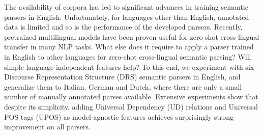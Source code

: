 The availability of corpora has led to significant advances in training  semantic parsers in English. Unfortunately, for languages other than English, annotated data is limited and so is the performance of the developed parsers. Recently, pretrained multilingual models have been proven useful for zero-shot cross-lingual transfer in many NLP tasks. What else does it require to apply a parser trained in English to other languages for zero-shot cross-lingual semantic parsing? Will simple language-independent features help? To this end, we experiment with six Discourse Representation Structure (DRS) semantic parsers in English, and generalize them to Italian, German and Dutch, where there are only a small number of manually annotated parses available. Extensive experiments show that despite its simplicity, adding  Universal Dependency (UD) relations and Universal POS tags (UPOS) as model-agnostic features achieves surprisingly strong improvement on all parsers.
